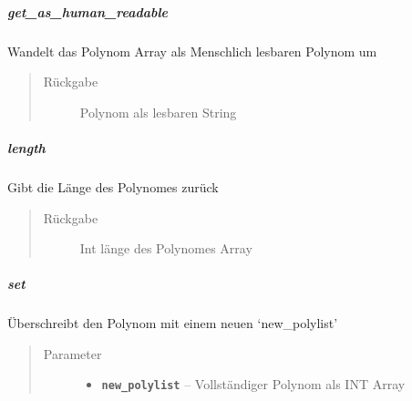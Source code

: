 \documentclass[letterpaper,10pt,ngerman]{sphinxmanual}
\begin{document}
\subparagraph{get\_as\_human\_readable}
\label{com/linuxluigi/polynomial/Polynomial:get-as-human-readable}

\begin{fulllineitems}
\label{com/linuxluigi/polynomial/Polynomial:com.linuxluigi.polynomial.Polynomial.get_as_human_readable()}
Wandelt das Polynom Array als Menschlich lesbaren Polynom um
\begin{quote}\begin{description}
\item[{Rückgabe}] \leavevmode
Polynom als lesbaren String

\end{description}\end{quote}

\end{fulllineitems}



\subparagraph{length}
\label{com/linuxluigi/polynomial/Polynomial:length}

\begin{fulllineitems}
\label{com/linuxluigi/polynomial/Polynomial:com.linuxluigi.polynomial.Polynomial.length()}
Gibt die Länge des Polynomes zurück
\begin{quote}\begin{description}
\item[{Rückgabe}] \leavevmode
Int länge des Polynomes Array

\end{description}\end{quote}

\end{fulllineitems}



\subparagraph{set}
\label{com/linuxluigi/polynomial/Polynomial:set}

\begin{fulllineitems}
\label{com/linuxluigi/polynomial/Polynomial:com.linuxluigi.polynomial.Polynomial.set(double__)}
Überschreibt den Polynom mit einem neuen `new\_polylist'
\begin{quote}\begin{description}
\item[{Parameter}] \leavevmode\begin{itemize}
\item {} 
\textbf{\texttt{new\_polylist}} -- Vollständiger Polynom als INT Array

\end{itemize}

\end{description}\end{quote}

\end{fulllineitems}
\end{document}

